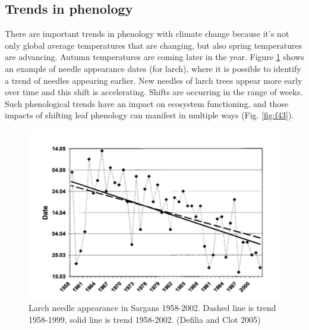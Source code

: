 \documentclass[12pt,oneside]{book}
\begin{document}
\subsection{Trends in phenology}\label{trends-in-phenology}

There are important trends in phenology with climate change because it's
not only global average temperatures that are changing, but also spring
temperatures are advancing. Autumn temperatures are coming later in the
year. Figure \ref{fig:f42} shows an example of needle appearance dates
(for larch), where it is possible to identify a trend of needles
appearing earlier. New needles of larch trees appear more early over
time and this shift is accelerating. Shifts are occurring in the range
of weeks. Such phenological trends have an impact on ecosystem
functioning, and those impacts of shifting leaf phenology can manifest
in multiple ways (Fig. \ref{fig:f43}).

\begin{figure}

{\centering \includegraphics[width=0.8\linewidth]{figures/chap4/f42_Defilia} 

}

\caption{Larch needle appearance in Sargans 1958-2002. Dashed line is trend 1958-1999, solid line is trend 1958-2002.  (Defilia and Clot 2005)}\label{fig:f42}
\end{figure}
\end{document}
